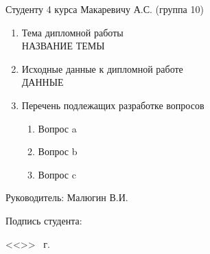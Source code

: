 \documentclass[../main.tex]{subfiles}
\begin{document}
	\begin{flushleft}
		Студенту 4 курса Макаревичу А.С. (группа 10)
	
		\vspace{1em}
		
		\begin{enumerate}
			\item Тема дипломной работы \\ НАЗВАНИЕ ТЕМЫ
			\item Исходные данные к дипломной работе \\ ДАННЫЕ
			\item Перечень подлежащих разработке вопросов
			\begin{enumerate}
				\item Вопрос a
				\item Вопрос b
				\item Вопрос c
			\end{enumerate}
			
		\end{enumerate}
		
		Руководитель: Малюгин В.И. \makebox[4cm]{\hrulefill}
		
		\vspace{1em}
		
		Подпись студента: \makebox[4cm]{\hrulefill}
		
		\vspace{1em}

		<<\makebox[1cm]{\hrulefill}>> \makebox[3cm]{\hrulefill} \the\year\, г.
		
	\end{flushleft}
	
		
	
	
\end{document}
